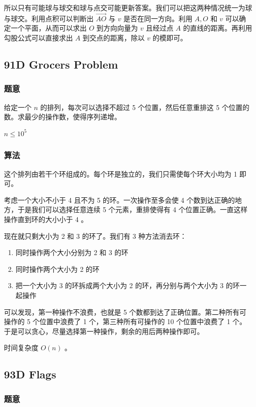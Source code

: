 \documentclass[11pt]{article}
\begin{document}
    所以只有可能球与球交和球与点交可能更新答案。我们可以把这两种情况统一为球与球交。利用点积可以判断出 $\vec{AO}$ 与 $v$ 是否在同一方向。利用 $A, O$ 和 $v$ 可以确定一个平面，从而可以求出 $O$ 到方向向量为 $v$ 且经过点 $A$ 的直线的距离。再利用勾股公式可以直接求出 $A$ 到交点的距离，除以 $v$ 的模即可。
\subsection{91D   Grocers Problem}
\label{sec-6-8}
\subsubsection{题意}
\label{sec-6-8-1}

    给定一个 $n$ 的排列，每次可以选择不超过 5 个位置，然后任意重排这 5 个位置的数。求最少的操作数，使得序列递增。

    $n \leq 10^5$
\subsubsection{算法}
\label{sec-6-8-2}

    这个排列由若干个环组成的。每个环是独立的，我们只需使每个环大小均为 1 即可。

    考虑一个大小不小于 4 且不为 5 的环。一次操作至多会使 4 个数到达正确的地方，于是我们可以选择任意连续 5 个元素，重排使得有 4 个位置正确。一直这样操作直到环的大小小于 4 。

    现在就只剩大小为 2 和 3 的环了。我们有 3 种方法消去环：
\begin{enumerate}
\item 同时操作两个大小分别为 2 和 3 的环
\item 同时操作两个大小为 2 的环
\item 把一个大小为 3 的环拆成两个大小为 2 的环，再分别与两个大小为 3 的环一起操作
\end{enumerate}

    可以发现，第一种操作不浪费，也就是 5 个数都到达了正确位置。第二种所有可操作的 5 个位置中浪费了 1 个，第三种所有可操作的 10 个位置中浪费了 1 个。于是可以贪心，尽量选择第一种操作，剩余的用后两种操作即可。

    时间复杂度 $O(n)$ 。
\subsection{93D   Flags}
\label{sec-6-9}
\subsubsection{题意}
\label{sec-6-9-1}
\end{document}
